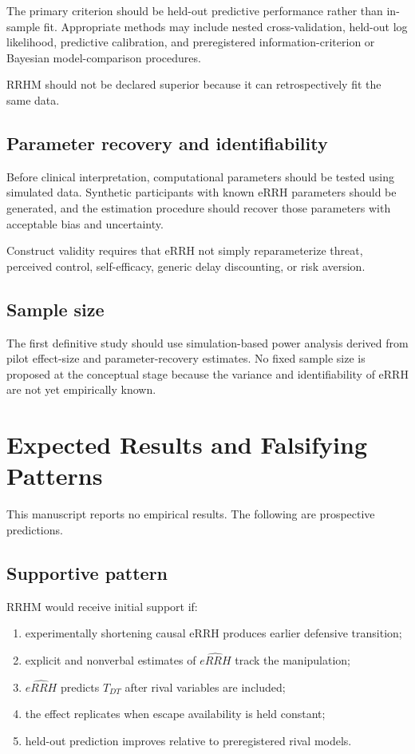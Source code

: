 \documentclass[9pt,twocolumn]{article}
\begin{document}
The primary criterion should be held-out predictive performance rather than in-sample fit. Appropriate methods may include nested cross-validation, held-out log likelihood, predictive calibration, and preregistered information-criterion or Bayesian model-comparison procedures.

RRHM should not be declared superior because it can retrospectively fit the same data.

\subsection{Parameter recovery and identifiability}
Before clinical interpretation, computational parameters should be tested using simulated data. Synthetic participants with known eRRH parameters should be generated, and the estimation procedure should recover those parameters with acceptable bias and uncertainty.

Construct validity requires that eRRH not simply reparameterize threat, perceived control, self-efficacy, generic delay discounting, or risk aversion.

\subsection{Sample size}
The first definitive study should use simulation-based power analysis derived from pilot effect-size and parameter-recovery estimates. No fixed sample size is proposed at the conceptual stage because the variance and identifiability of eRRH are not yet empirically known.

\section{Expected Results and Falsifying Patterns}
This manuscript reports no empirical results. The following are prospective predictions.

\subsection{Supportive pattern}
RRHM would receive initial support if:
\begin{enumerate}[leftmargin=2em]
\item experimentally shortening causal eRRH produces earlier defensive transition;
\item explicit and nonverbal estimates of $\widehat{eRRH}$ track the manipulation;
\item $\widehat{eRRH}$ predicts $T_{DT}$ after rival variables are included;
\item the effect replicates when escape availability is held constant;
\item held-out prediction improves relative to preregistered rival models.
\end{enumerate}
\end{document}
